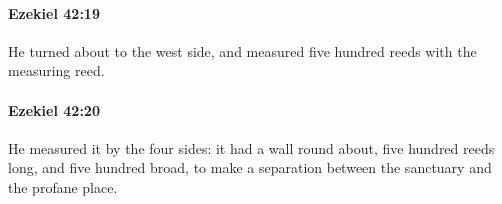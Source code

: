 		\paragraph{Ezekiel 42:19} %
			\label{EZEKIEL-42-19}

			He turned about to the west side, and measured five hundred reeds with the measuring reed.


		\paragraph{Ezekiel 42:20} %
			\label{EZEKIEL-42-20}

			He measured it by the four sides: it had a wall round about, five hundred reeds long, and five hundred broad, to make a separation between the sanctuary and the profane place.

